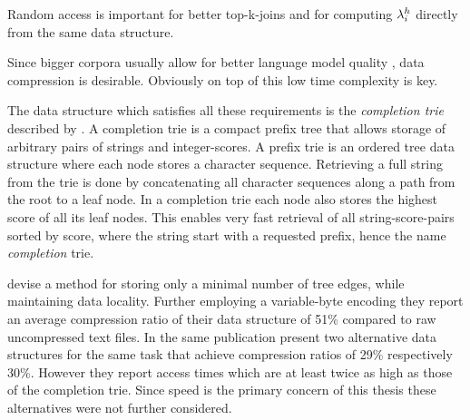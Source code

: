 \begin{draft}
Random access is important for better top-k-joins and for computing
$\lambda^h_i$ directly from the same data structure.
\end{draft}

\begin{draft}
Since bigger corpora usually allow for better language model quality \noref,
data compression is desirable.
Obviously on top of this low time complexity is key.
\end{draft}

The data structure which satisfies all these requirements is the
\emph{completion trie} described by \textcite{HsuOttaviano2013}.
A completion trie is a compact prefix tree that allows storage of arbitrary
pairs of strings and integer-scores.
A prefix trie is an ordered tree data structure where each node stores a
character sequence.
Retrieving a full string from the trie is done by concatenating all character
sequences along a path from the root to a leaf node.
In a completion trie each node also stores the highest score of all its leaf
nodes.
This enables very fast retrieval of all string-score-pairs sorted by score,
where the string start with a requested prefix, hence the name
\emph{completion} trie.

\textcite{HsuOttaviano2013} devise a method for storing only a minimal number of
tree edges, while maintaining data locality.
Further employing a variable-byte encoding they report an average compression
ratio of their data structure of 51\% compared to raw uncompressed text files.
In the same publication \textcite{HsuOttaviano2013} present two alternative
data structures for the same task that achieve compression ratios of 29\%
respectively 30\%.
However they report access times which are at least twice as high as those
of the completion trie.
Since speed is the primary concern of this thesis these alternatives
were not further considered.

